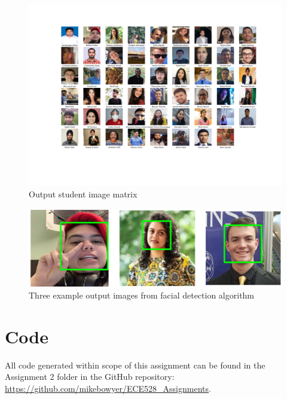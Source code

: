 \documentclass[12pt, letterpaper, final, onecolumn, titlepage] {article}
\begin{document}
\doublespacing

\begin{figure}[htbp]
	\centerline{\includegraphics[scale=.4]{students.png}}
	\caption{Output student image matrix}
	\label{studentMatrix}
\end{figure}

\begin{figure}[htbp]
	\centerline{\includegraphics[scale=.75]{FacialDetectionImages/FacialDetection.png}}
	\caption{Three example output images from facial detection algorithm}
	\label{facialDetect}
\end{figure}

\pagebreak

\section{Code}

All code generated within scope of this assignment can be found in the Assignment 2 folder in the GitHub repository:
\url{https://github.com/mikebowyer/ECE528_Assignments}.
\end{document}

